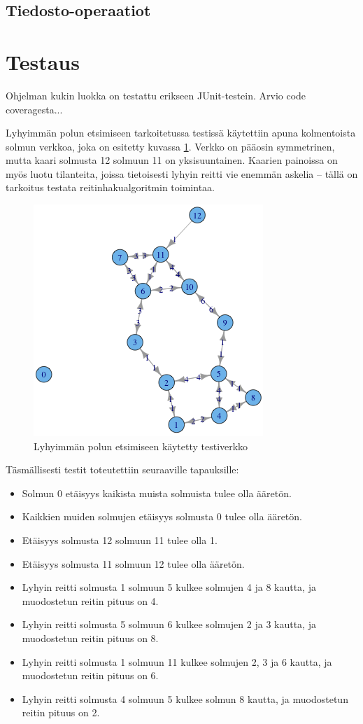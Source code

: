 \documentclass[10pt,a4paper]{article}
\begin{document}
\subsection{Tiedosto-operaatiot}
\label{io}

\section{Testaus}
\label{test}

Ohjelman kukin luokka on testattu erikseen JUnit-testein. Arvio code coveragesta...

Lyhyimmän polun etsimiseen tarkoitetussa testissä käytettiin apuna kolmentoista solmun verkkoa, joka on esitetty kuvassa \ref{testiverkko}. Verkko on pääosin symmetrinen, mutta kaari solmusta 12 solmuun 11 on yksisuuntainen. Kaarien painoissa on myös luotu tilanteita, joissa tietoisesti lyhyin reitti vie enemmän askelia -- tällä on tarkoitus testata reitinhakualgoritmin toimintaa.

\begin{figure}
\includegraphics[scale=.5]{test_network.png} 
\caption{Lyhyimmän polun etsimiseen käytetty testiverkko}
\label{testiverkko}
\end{figure}

Täsmällisesti testit toteutettiin seuraaville tapauksille:

\begin{itemize}
\item Solmun 0 etäisyys kaikista muista solmuista tulee olla ääretön.
\item Kaikkien muiden solmujen etäisyys solmusta 0 tulee olla ääretön.
\item Etäisyys solmusta 12 solmuun 11 tulee olla 1.
\item Etäisyys solmusta 11 solmuun 12 tulee olla ääretön.
\item Lyhyin reitti solmusta 1 solmuun 5 kulkee solmujen 4 ja 8 kautta, ja muodostetun reitin pituus on 4.
\item Lyhyin reitti solmusta 5 solmuun 6 kulkee solmujen 2 ja 3 kautta, ja muodostetun reitin pituus on 8.
\item Lyhyin reitti solmusta 1 solmuun 11 kulkee solmujen 2, 3 ja 6 kautta, ja muodostetun reitin pituus on 6.
\item Lyhyin reitti solmusta 4 solmuun 5 kulkee solmun 8 kautta, ja muodostetun reitin pituus on 2.
\end{itemize}
\end{document}
